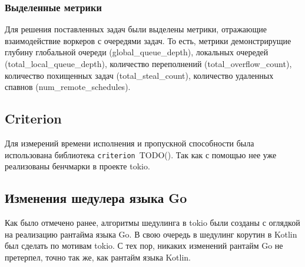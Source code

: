 \subsubsection{Выделенные метрики}

Для решения поставленных задач были выделены метрики, отражающие взаимодействие воркеров с очередями задач. То есть, метрики демонстрирущие глубину глобальной очереди (global\_queue\_depth), локальных очередей (total\_local\_queue\_depth), количество переполнений (total\_overflow\_count), количество похищенных задач (total\_steal\_count), количество удаленных спавнов (num\_remote\_schedules).

\subsection{Criterion}

Для измерений времени исполнения и пропускной способности была использована библиотека \verb|criterion|~TODO(). Так как с помощью нее уже реализованы бенчмарки в проекте tokio.

\subsection{Изменения шедулера языка Go}

Как было отмечено ранее, алгоритмы шедулинга в tokio были созданы с оглядкой на реализацию рантайма языка Go. В свою очередь в шедулинг корутин в Kotlin был сделать по мотивам tokio. С тех пор, никаких изменений рантайм Go не претерпел, точно так же, как рантайм языка Kotlin.
